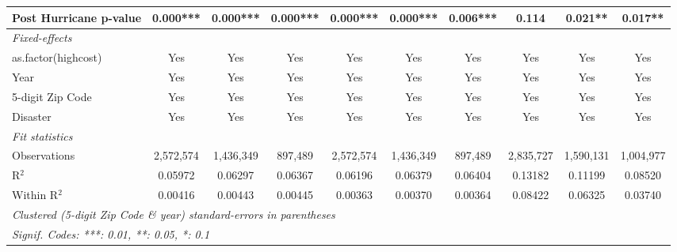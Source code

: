 \begin{tabular}{lccccccccc}
   Post Hurricane p-value                                     & 0.000***       & 0.000***       & 0.000***       & 0.000***      & 0.000***       & 0.006***              & 0.114         & 0.021**               & 0.017**\\  
   \midrule
   \emph{Fixed-effects}\\
   as.factor(highcost)                                        & Yes            & Yes            & Yes            & Yes           & Yes            & Yes                   & Yes           & Yes                   & Yes\\  
   Year                                                       & Yes            & Yes            & Yes            & Yes           & Yes            & Yes                   & Yes           & Yes                   & Yes\\  
   5-digit Zip Code                                           & Yes            & Yes            & Yes            & Yes           & Yes            & Yes                   & Yes           & Yes                   & Yes\\  
   Disaster                                                   & Yes            & Yes            & Yes            & Yes           & Yes            & Yes                   & Yes           & Yes                   & Yes\\  
   \midrule
   \emph{Fit statistics}\\
   Observations                                               & 2,572,574      & 1,436,349      & 897,489        & 2,572,574     & 1,436,349      & 897,489               & 2,835,727     & 1,590,131             & 1,004,977\\  
   R$^2$                                                      & 0.05972        & 0.06297        & 0.06367        & 0.06196       & 0.06379        & 0.06404               & 0.13182       & 0.11199               & 0.08520\\  
   Within R$^2$                                               & 0.00416        & 0.00443        & 0.00445        & 0.00363       & 0.00370        & 0.00364               & 0.08422       & 0.06325               & 0.03740\\  
   \midrule \midrule
   \multicolumn{10}{l}{\emph{Clustered (5-digit Zip Code \& year) standard-errors in parentheses}}\\
   \multicolumn{10}{l}{\emph{Signif. Codes: ***: 0.01, **: 0.05, *: 0.1}}\\
\end{tabular}
\par\endgroup
